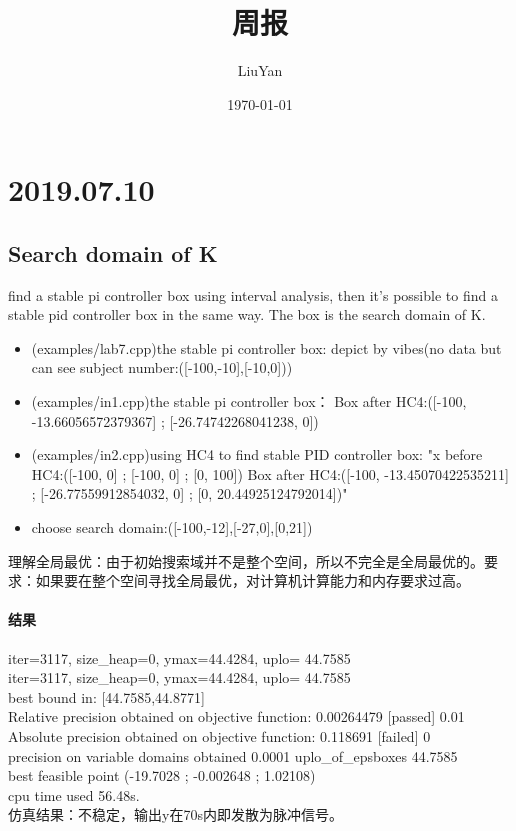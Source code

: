 \documentclass[UTF8,a4paper]{ctexart}
\title{周报}
\author{LiuYan}
\date{\today}
\begin{document}
\section{2019.07.10}
\subsection{Search domain of K}
find a stable pi controller box using interval analysis, then it's possible to find a stable pid controller box in the same way. The box is the search domain of K.
\begin{itemize}
\item (examples/lab7.cpp)the stable pi controller box: depict by vibes(no data but can see subject number:([-100,-10],[-10,0]))\\
\item (examples/in1.cpp)the stable pi controller box： Box after HC4:([-100, -13.66056572379367] ; [-26.74742268041238, 0])\\
\item (examples/in2.cpp)using HC4 to find stable PID controller box: "x before HC4:([-100, 0] ; [-100, 0] ; [0, 100])
 Box after HC4:([-100, -13.45070422535211] ; [-26.77559912854032, 0] ; [0, 20.44925124792014])"
\\
\item choose search domain:([-100,-12],[-27,0],[0,21])
\end{itemize}
理解全局最优：由于初始搜索域并不是整个空间，所以不完全是全局最优的。要求：如果要在整个空间寻找全局最优，对计算机计算能力和内存要求过高。
\paragraph{结果}
iter=3117,  size_heap=0,  ymax=44.4284,  uplo= 44.7585\\
iter=3117,  size_heap=0,  ymax=44.4284,  uplo= 44.7585\\
 best bound in: [44.7585,44.8771]\\
 Relative precision obtained on objective function: 0.00264479  [passed]  0.01\\
 Absolute precision obtained on objective function: 0.118691  [failed]  0\\
 precision on variable domains obtained 0.0001  uplo_of_epsboxes 44.7585\\
 best feasible point (-19.7028 ; -0.002648 ; 1.02108)\\
 cpu time used 56.48s.\\
 仿真结果：不稳定，输出y在70s内即发散为脉冲信号。
\end{document}
